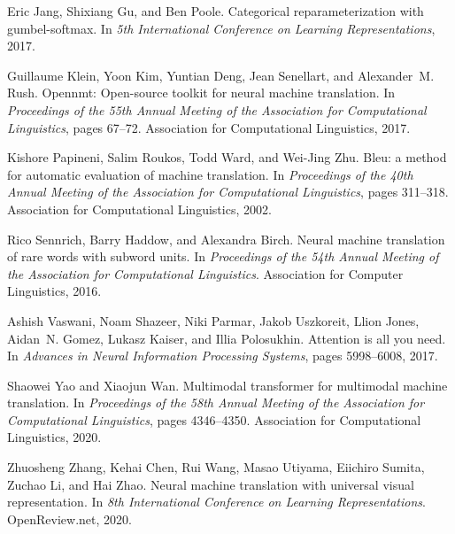 \documentclass{article}
\begin{document}
\begin{thebibliography}{}
Eric Jang, Shixiang Gu, and Ben Poole.
\newblock Categorical reparameterization with gumbel-softmax.
\newblock In {\em 5th International Conference on Learning Representations},
  2017.

Guillaume Klein, Yoon Kim, Yuntian Deng, Jean Senellart, and Alexander~M. Rush.
\newblock Opennmt: Open-source toolkit for neural machine translation.
\newblock In {\em Proceedings of the 55th Annual Meeting of the Association for
  Computational Linguistics}, pages 67--72. Association for Computational
  Linguistics, 2017.

Kishore Papineni, Salim Roukos, Todd Ward, and Wei{-}Jing Zhu.
\newblock Bleu: a method for automatic evaluation of machine translation.
\newblock In {\em Proceedings of the 40th Annual Meeting of the Association for
  Computational Linguistics}, pages 311--318. Association for Computational
  Linguistics, 2002.

Rico Sennrich, Barry Haddow, and Alexandra Birch.
\newblock Neural machine translation of rare words with subword units.
\newblock In {\em Proceedings of the 54th Annual Meeting of the Association for
  Computational Linguistics}. Association for Computer Linguistics, 2016.

Ashish Vaswani, Noam Shazeer, Niki Parmar, Jakob Uszkoreit, Llion Jones,
  Aidan~N. Gomez, Lukasz Kaiser, and Illia Polosukhin.
\newblock Attention is all you need.
\newblock In {\em Advances in Neural Information Processing Systems}, pages
  5998--6008, 2017.

Shaowei Yao and Xiaojun Wan.
\newblock Multimodal transformer for multimodal machine translation.
\newblock In {\em Proceedings of the 58th Annual Meeting of the Association for
  Computational Linguistics}, pages 4346--4350. Association for Computational
  Linguistics, 2020.

Zhuosheng Zhang, Kehai Chen, Rui Wang, Masao Utiyama, Eiichiro Sumita, Zuchao
  Li, and Hai Zhao.
\newblock Neural machine translation with universal visual representation.
\newblock In {\em 8th International Conference on Learning Representations}.
  OpenReview.net, 2020.


\end{thebibliography}
\end{document}
